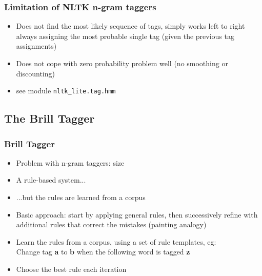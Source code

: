 \documentclass{beamer}
\begin{document}
\begin{frame}[fragile]
  \frametitle{Limitation of NLTK n-gram taggers}

  \begin{itemize}
  \item Does not find the most likely sequence of tags, simply works
    left to right always assigning the most probable single tag (given
    the previous tag assignments)
  \item Does not cope with zero probability problem well (no smoothing
    or discounting)
  \item see module \verb|nltk_lite.tag.hmm|
  \end{itemize}
\end{frame}

\subsection{The Brill Tagger}

\begin{frame}
  \frametitle{Brill Tagger}
  \begin{itemize}
  \item Problem with n-gram taggers: size
  \item A rule-based system...
  \item ...but the rules are learned from a corpus
  \item Basic approach: start by applying general rules, then
    successively refine with additional rules that correct the
    mistakes (painting analogy)
  \item Learn the rules from a corpus, using a set of rule templates,
    eg:\\
    Change tag \textbf{a} to \textbf{b} when the following word is
    tagged \textbf{z}
  \item Choose the best rule each iteration    
  \end{itemize}
\end{frame}
\end{document}

